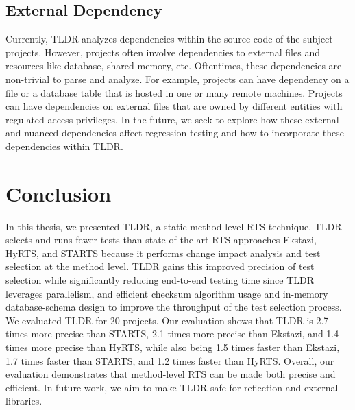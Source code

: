 \subsection{External Dependency}
Currently, TLDR analyzes dependencies within the source-code of the subject projects. However, projects often involve dependencies to external files and resources like database, shared memory, etc. Oftentimes, these dependencies are non-trivial to parse and analyze. For example, projects can have dependency on a file or a database table that is hosted in one or many remote machines. Projects can have dependencies on external files that are owned by different entities with regulated access privileges. In the future, we seek to explore how these external and nuanced dependencies affect regression testing and how to incorporate these dependencies within TLDR. 

\section{Conclusion}

In this thesis, we presented TLDR, a static method-level RTS technique. TLDR selects and runs fewer tests than state-of-the-art RTS approaches Ekstazi, HyRTS, and STARTS because it performs change impact analysis and test selection at the method level. TLDR gains this improved precision of test selection while significantly reducing end-to-end testing time since TLDR leverages parallelism, and efficient checksum algorithm usage and in-memory database-schema design to improve the throughput of the test selection process. We evaluated TLDR for 20 projects. Our evaluation shows that TLDR is 2.7 times more precise than STARTS, 2.1 times more precise than Ekstazi, and 1.4 times more precise than HyRTS, while also being 1.5 times faster than Ekstazi, 1.7 times faster than STARTS, and 1.2 times faster than HyRTS. Overall, our evaluation demonstrates that method-level RTS can be made both precise and efficient. In future work, we aim to make TLDR safe for reflection and external libraries.  



